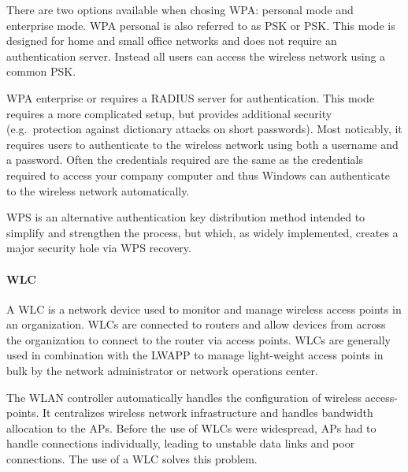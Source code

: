 There are two options available when chosing \ac{WPA}: personal mode and enterprise mode.
\ac{WPA} personal is also referred to as \acs{PSK} or \acl{PSK}.
This mode is designed for home and small office networks and does not require an authentication server.
Instead all users can access the wireless network using a common \acl{PSK}.

\ac{WPA} enterprise or  requires a \ac{RADIUS} server for authentication.
This mode requires a more complicated setup, but provides additional security (e.g.\ protection against dictionary attacks on short passwords).
Most noticably, it requires users to authenticate to the wireless network using both a username and a password.
Often the credentials required are the same as the credentials required to access your company computer and thus Windows can authenticate to the wireless network automatically.

\ac{WPS} is an alternative authentication key distribution method intended to simplify and strengthen the process, but which, as widely implemented, creates a major security hole via \ac{WPS}  recovery.

\paragraph{\acl{WLC}}
A \acf{WLC} is a network device used to monitor and manage wireless access points in an organization.
\acsp{WLC} are connected to routers and allow devices from across the organization to connect to the router via access points.
\aclp{WLC} are generally used in combination with the \ac{LWAPP} to manage light-weight access points in bulk by the network administrator or network operations center.

The \acs{WLAN} controller automatically handles the configuration of wireless access-points.
It centralizes wireless network infrastructure and handles bandwidth allocation to the \aclp{AP}.
Before the use of \acsp{WLC} were widespread, \aclp{AP} had to handle connections individually, leading to unstable data links and poor connections.
The use of a \acs{WLC} solves this problem.


